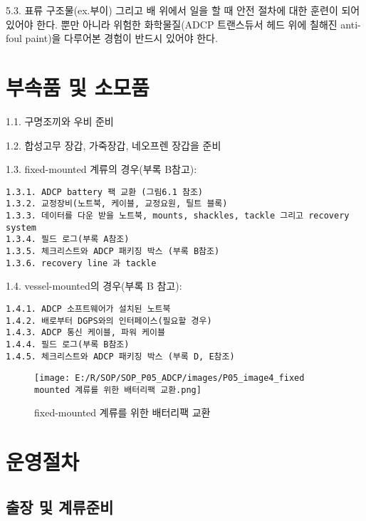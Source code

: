 \documentclass[
]{book}
\begin{document}
5.3. 표류 구조물(ex.부이) 그리고 배 위에서 일을 할 때 안전 절차에 대한 훈련이 되어있어야 한다. 뿐만 아니라 위험한 화학물질(ADCP 트랜스듀서 헤드 위에 칠해진 anti-foul paint)을 다루어본 경험이 반드시 있어야 한다.

\hypertarget{uxbd80uxc18duxd488-uxbc0f-uxc18cuxbaa8uxd488}{%
\section{부속품 및 소모품}\label{uxbd80uxc18duxd488-uxbc0f-uxc18cuxbaa8uxd488}}

1.1. 구명조끼와 우비 준비

1.2. 합성고무 장갑, 가죽장갑, 네오프렌 장갑을 준비

1.3. fixed-mounted 계류의 경우(부록 B참고):

\begin{verbatim}
1.3.1. ADCP battery 팩 교환 (그림6.1 참조)
1.3.2. 교정장비(노트북, 케이블, 교정요원, 틸트 블록)
1.3.3. 데이터를 다운 받을 노트북, mounts, shackles, tackle 그리고 recovery system
1.3.4. 필드 로그(부록 A참조)
1.3.5. 체크리스트와 ADCP 패키징 박스 (부록 B참조)
1.3.6. recovery line 과 tackle
\end{verbatim}

1.4. vessel-mounted의 경우(부록 B 참고):

\begin{verbatim}
1.4.1. ADCP 소프트웨어가 설치된 노트북
1.4.2. 배로부터 DGPS와의 인터페이스(필요할 경우)
1.4.3. ADCP 통신 케이블, 파워 케이블
1.4.4. 필드 로그(부록 B참조)
1.4.5. 체크리스트와 ADCP 패키징 박스 (부록 D, E참조)
\end{verbatim}

\begin{figure}
\centering
\texttt{[image: E:/R/SOP/SOP\_P05\_ADCP/images/P05\_image4\_fixed mounted 계류를 위한 배터리팩 교환.png]}
\caption{fixed-mounted 계류를 위한 배터리팩 교환}
\end{figure}

\hypertarget{uxc6b4uxc601uxc808uxcc28-1}{%
\section{운영절차}\label{uxc6b4uxc601uxc808uxcc28-1}}

\hypertarget{uxcd9cuxc7a5-uxbc0f-uxacc4uxb958uxc900uxbe44}{%
\subsection{출장 및 계류준비}\label{uxcd9cuxc7a5-uxbc0f-uxacc4uxb958uxc900uxbe44}}
\end{document}
